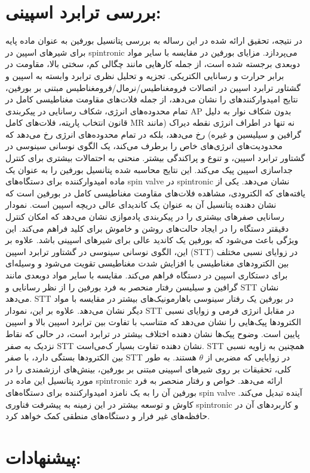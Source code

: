 \section{بررسی ترابرد اسپینی:}
در نتیجه، تحقیق ارائه شده در این رساله به بررسی پتانسیل ‌بورفین به عنوان ماده پایه برای شیرهای اسپین در \gls{spintronic} ‌‌می‌‌پردازد. مزایای ‌بورفین در مقایسه با سایر مواد دوبعدی برجسته شده است، از جمله کارهایی مانند چگالی کم، سختی بالا، مقاومت در برابر حرارت و رسانایی الکتریکی. تجزیه و تحلیل نظری ترابرد وابسته به اسپین و گشتاور ترابرد اسپین در اتصالات فرومغناطیس/نرمال/فرومغناطیس مبتنی بر ‌بورفین، نتایج ا‌میدوارکنندهای را نشان ‌می‌دهد، از جمله فلات‌های مقاومت مغناطیسی کامل در تمام محدوده‌های انرژی، شکاف رسانایی در پیکربندی \gls{AP} بدون شکاف نوار به دلیل قانون انتخاب پاریته، فلات‌های کامل \gls{MR} نه تنها در اطراف انرژی نقطه دیراک (مانند گرافین و سیلیسین و غیره) رخ ‌‌می‌‌دهد، بلکه در تمام محدوده‌های انرژی رخ ‌‌می‌‌دهد که محدودیت‌های انرژی‌های خاص را برطرف ‌‌می‌‌کند، یک الگوی نوسانی سینوسی در گشتاور ترابرد اسپین، و تنوع و پراکندگی بیشتر. منحنی  به احتمالات بیشتری برای کنترل جداسازی اسپین پیک ‌می‌کند. این نتایج محاسبه شده پتانسیل ‌بورفین را به عنوان یک ماده ا‌میدوارکننده برای دستگاه‌های \gls{spin valve} در \gls{spintronic} نشان ‌می‌دهد. یکی از یافته‌های که الکترودی، مشاهده فلات‌های مقاومت مغناطیسی کامل در ‌بورفین است که نشان دهنده پتانسیل آن به عنوان یک کاندیدای عالی دریچه اسپین است. نمودار رسانایی صفرهای بیشتری را در پیکربندی پاد‌موازی نشان ‌می‌دهد که امکان کنترل دقیقتر دستگاه را در ایجاد حالت‌های روشن و خاموش برای کلید فراهم ‌می‌کند. این ویژگی باعث ‌‌می‌‌شود که ‌بورفین یک کاندید عالی برای شیرهای اسپینی باشد. علاوه بر این، الگوی نوسانی سینوسی در گشتاور ترابرد اسپین (\gls{STT}) در زوایای نسبی مختلف بین الکترودهای مغناطیسی با افزایش شدت مغناطیسی تقویت ‌می‌شود و وسیله‌ای برای دستکاری اسپین در دستگاه فراهم ‌می‌کند. مقایسه با سایر مواد دوبعدی مانند گرافین و سیلیسن رفتار منحصر به فرد ‌بورفین را از نظر رسانایی و \gls{STT} نشان ‌‌می‌‌دهد. \gls{STT} در ‌بورفین یک رفتار سینوسی با‌هارمونیک‌های بیشتر در مقایسه با مواد دیگر نشان ‌‌می‌‌دهد. علاوه بر این، نمودار \gls{STT} در مقابل انرژی فر‌‌می‌‌ و زوایای نسبی الکترودها پیک‌هایی را نشان ‌می‌دهد که متناسب با تفاوت بین ترابرد اسپین بالا و اسپین پایین است. وضوح پیک‌ها نشان دهنده اختلاف بیشتر در ترابرد است، در حالی که نقاط نزدیک به صفر \gls{STT} نشان دهنده تفاوت بسیار ک‌‌می‌‌است. \gls{STT} همچنین به زاویه نسبی بین الکترودها بستگی دارد، با صفر \gls{STT} در زوایایی که مضربی از $\theta$ هستند. به طور کلی، تحقیقات بر روی شیرهای اسپینی مبتنی بر ‌بورفین، بینش‌های ارزشمندی را در مورد پتانسیل این ماده در \gls{spintronic} ارائه ‌‌می‌‌دهد. خواص و رفتار منحصر به فرد ‌بورفین آن را به یک نامزد ا‌میدوارکننده برای دستگاه‌های \gls{spin valve} آینده تبدیل ‌‌می‌‌کند. کاوش و توسعه بیشتر در این ز‌مینه به پیشرفت فناوری \gls{spintronic} و کاربردهای آن در حافظه‌های غیر فرار و دستگاه‌های منطقی کمک خواهد کرد.




\section{پیشنهادات:}
